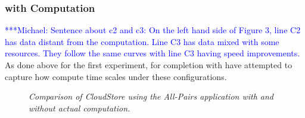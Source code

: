 \documentclass{rspublic}
\newcommand{\micnote}[1]{ {\textcolor{blue} { ***Michael: #1 }}}
\begin{document}
\subsubsection{with Computation}  \micnote{Sentence about c2 and c3:  On
the left hand side of Figure 3, line C2 has data distant from the
computation.  Line C3 has data mixed with some resources.  They follow
the same curves with line C3 having speed improvements.} As done above
for the first experiment, for completion with have attempted to capture
how compute time scales under these configurations.
\begin{center}
\begin{figure}
\caption{\textit{Comparison of CloudStore using the All-Pairs
application with and without actual computation.}}
\label{experiment4}
\end{figure}
\end{center}
\end{document}

